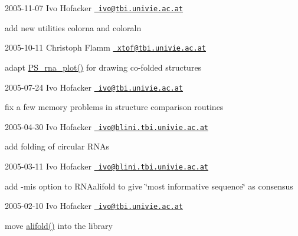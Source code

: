 2005-\/11-\/07 Ivo Hofacker \href{mailto:ivo@tbi.univie.ac.at}{\texttt{ ivo@tbi.\+univie.\+ac.\+at}}


\begin{DoxyItemize}
\item add new utilities colorna and coloraln
\end{DoxyItemize}

2005-\/10-\/11 Christoph Flamm \href{mailto:xtof@tbi.univie.ac.at}{\texttt{ xtof@tbi.\+univie.\+ac.\+at}}


\begin{DoxyItemize}
\item adapt \mbox{\hyperlink{group__plotting__utils_ga0873c7cc4cd7a11c9a2cea19dde7e9c9}{P\+S\+\_\+rna\+\_\+plot()}} for drawing co-\/folded structures
\end{DoxyItemize}

2005-\/07-\/24 Ivo Hofacker \href{mailto:ivo@tbi.univie.ac.at}{\texttt{ ivo@tbi.\+univie.\+ac.\+at}}


\begin{DoxyItemize}
\item fix a few memory problems in structure comparison routines
\end{DoxyItemize}

2005-\/04-\/30 Ivo Hofacker \href{mailto:ivo@blini.tbi.univie.ac.at}{\texttt{ ivo@blini.\+tbi.\+univie.\+ac.\+at}}


\begin{DoxyItemize}
\item add folding of circular R\+N\+As
\end{DoxyItemize}

2005-\/03-\/11 Ivo Hofacker \href{mailto:ivo@blini.tbi.univie.ac.at}{\texttt{ ivo@blini.\+tbi.\+univie.\+ac.\+at}}


\begin{DoxyItemize}
\item add -\/mis option to R\+N\+Aalifold to give \char`\"{}most informative
    sequence\char`\"{} as consensus
\end{DoxyItemize}

2005-\/02-\/10 Ivo Hofacker \href{mailto:ivo@tbi.univie.ac.at}{\texttt{ ivo@tbi.\+univie.\+ac.\+at}}


\begin{DoxyItemize}
\item move \mbox{\hyperlink{group__mfe__global__deprecated_ga4cf00f0659e5f0480335d69e797f05b1}{alifold()}} into the library
\end{DoxyItemize}

